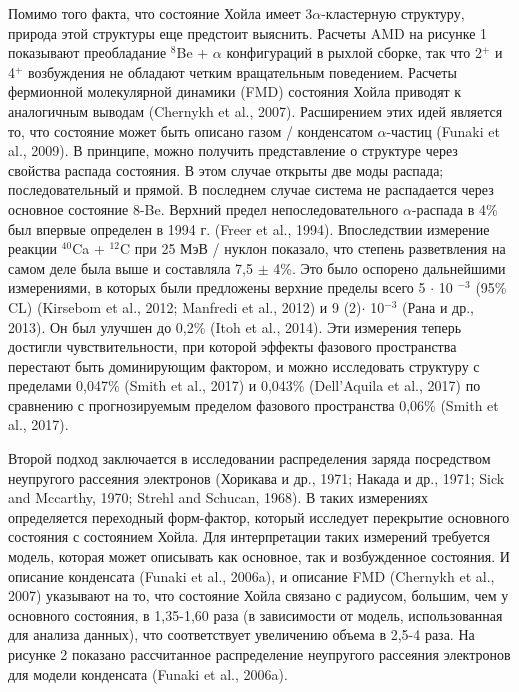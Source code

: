 \documentclass[fontsize=14pt]{scrarticle}
\begin{document}
Помимо того факта, что состояние Хойла имеет 3$\alpha$-кластерную структуру, природа этой структуры еще предстоит выяснить. Расчеты AMD на рисунке 1 показывают преобладание $^{8}$Be + $\alpha$ конфигураций в рыхлой сборке, так что 2$^{+}$ и 4$^{+}$ возбуждения не обладают четким вращательным поведением. Расчеты фермионной молекулярной динамики (FMD) состояния Хойла приводят к аналогичным выводам (Chernykh et al., 2007). Расширением этих идей является то, что состояние может быть описано газом / конденсатом $\alpha$-частиц (Funaki et al., 2009). В принципе, можно получить представление о структуре через свойства распада состояния. В этом случае открыты две моды распада; последовательный и прямой. В последнем случае система не распадается через основное состояние 8-Be. Верхний предел непоследовательного $\alpha$-распада в 4\% был впервые определен в 1994 г. (Freer et al., 1994). Впоследствии измерение реакции $^{40}$Ca + $^{12}$C при 25 МэВ / нуклон показало, что степень разветвления на самом деле была выше и составляла 7,5 $\pm$ 4\%. Это было оспорено дальнейшими измерениями, в которых были предложены верхние пределы всего 5 $\cdot$ 10 $^{-3}$ (95\% CL) (Kirsebom et al., 2012; Manfredi et al., 2012) и 9 (2)$\cdot$ 10$^{-3}$ (Рана и др., 2013). Он был улучшен до 0,2\% (Itoh et al., 2014). Эти измерения теперь достигли чувствительности, при которой эффекты фазового пространства перестают быть доминирующим фактором, и можно исследовать структуру с пределами 0,047\% (Smith et al., 2017) и 0,043\% (Dell'Aquila et al., 2017) по сравнению с прогнозируемым пределом фазового пространства 0,06\% (Smith et al., 2017).

Второй подход заключается в исследовании распределения заряда посредством неупругого рассеяния электронов (Хорикава и др., 1971; Накада и др., 1971; Sick and Mccarthy, 1970; Strehl and Schucan, 1968). В таких измерениях определяется переходный форм-фактор, который исследует перекрытие основного состояния с состоянием Хойла. Для интерпретации таких измерений требуется модель, которая может описывать как основное, так и возбужденное состояния. И описание конденсата (Funaki et al., 2006a), и описание FMD (Chernykh et al., 2007) указывают на то, что состояние Хойла связано с радиусом, большим, чем у основного состояния, в 1,35-1,60 раза (в зависимости от модель, использованная для анализа данных), что соответствует увеличению объема в 2,5-4 раза. На рисунке 2 показано рассчитанное распределение неупругого рассеяния электронов для модели конденсата (Funaki et al., 2006a).
\end{document}
